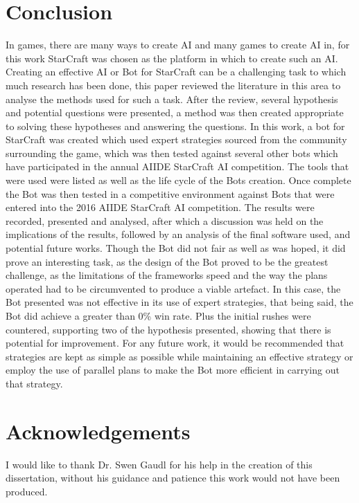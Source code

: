 \documentclass[journal]{IEEEtran}
\begin{document}
	\section{Conclusion}
	In games, there are many ways to create AI and many games to create AI in, for this work StarCraft was chosen as the platform in which to create such an AI. Creating an effective AI or Bot for StarCraft can be a challenging task to which much research has been done, this paper reviewed the literature in this area to analyse the methods used for such a task. After the review, several hypothesis and potential questions were presented, a method was then created appropriate to solving these hypotheses and answering the questions. In this work, a bot for StarCraft was created which used expert strategies sourced from the community surrounding the game, which was then tested against several other bots which have participated in the annual AIIDE StarCraft AI competition. The tools that were used were listed as well as the life cycle of the Bots creation. Once complete the Bot was then tested in a competitive environment against Bots that were entered into the 2016 AIIDE StarCraft AI competition. The results were recorded, presented and analysed, after which a discussion was held on the implications of the results, followed by an analysis of the final software used, and potential future works. 
	Though the Bot did not fair as well as was hoped, it did prove an interesting task, as the design of the Bot proved to be the greatest challenge, as the limitations of the frameworks speed and the way the plans operated had to be circumvented to produce a viable artefact. In this case, the Bot presented was not effective in its use of expert strategies, that being said, the Bot did achieve a greater than 0\% win rate. Plus the initial rushes were countered, supporting two of the hypothesis presented, showing that there is potential for improvement. For any future work, it would be recommended that strategies are kept as simple as possible while maintaining an effective strategy or employ the use of parallel plans to make the Bot more efficient in carrying out that strategy.    
	
	
	
	
	
	\appendices
	\section*{Acknowledgements}
	I would like to thank Dr. Swen Gaudl for his help in the creation of this dissertation, without his guidance and patience this work would not have been produced.
	
\end{document}
